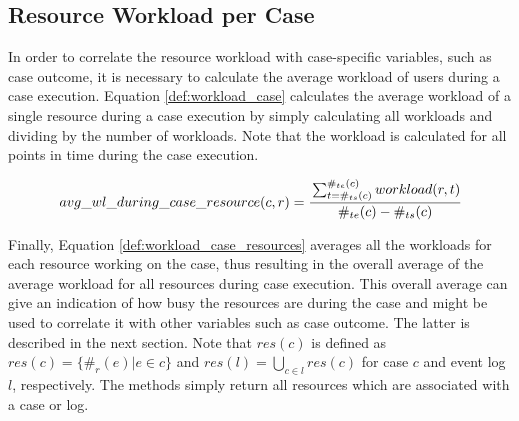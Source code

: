 


\subsection{Resource Workload per Case}
In order to correlate the resource workload with case-specific variables, such as case outcome, it is necessary to calculate the average workload of users during a case execution. Equation \ref{def:workload_case} calculates the average workload of a single resource during a case execution by simply calculating all workloads and dividing by the number of workloads. Note that the workload is calculated for all points in time during the case execution. 

\begin{equation}\label{def:workload_case}
    avg\_wl\_during\_case\_resource(c, r) = \cfrac{\sum_{t=\#_{ts}(c)}^{\#_{te}(c)} workload(r,t)}{\#_{te}(c)-\#_{ts}(c)}
\end{equation}

Finally, Equation \ref{def:workload_case_resources} averages all the workloads for each resource working on the case, thus resulting in the overall average of the average workload for all resources during case execution. This overall average can give an indication of how busy the resources are during the case and might be used to correlate it with other variables such as case outcome. The latter is described in the next section. Note that $res(c)$ is defined as $res(c) = \{\#_{r}(e) | e \in c\}$ and $res(l) = \bigcup_{c \in l} res(c)$ for case $c$ and event log $l$, respectively. The methods simply return all resources which are associated with a case or log. 

